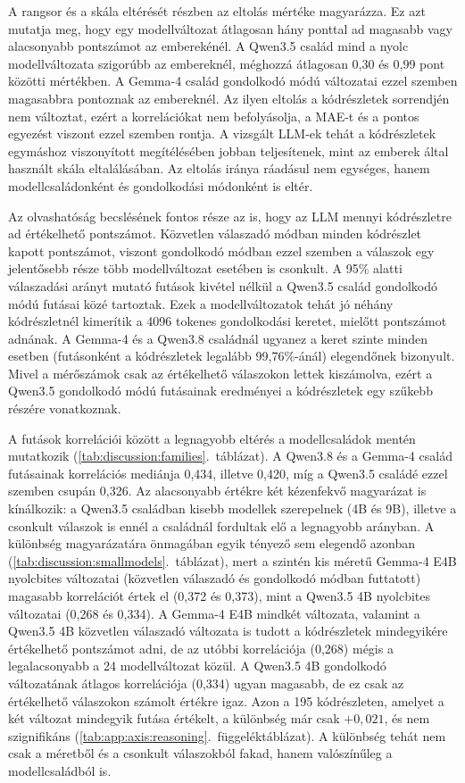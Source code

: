 \documentclass[
]{elteikthesis}[2024/04/26]
\begin{document}
A rangsor és a skála eltérését részben az eltolás mértéke magyarázza.
Ez azt mutatja meg, hogy egy modellváltozat átlagosan hány ponttal ad magasabb vagy alacsonyabb pontszámot az emberekénél.
A Qwen3.5 család mind a nyolc modellváltozata szigorúbb az embereknél, méghozzá átlagosan 0,30 és 0,99 pont közötti mértékben.
A Gemma-4 család gondolkodó módú változatai ezzel szemben magasabbra pontoznak az embereknél.
Az ilyen eltolás a kódrészletek sorrendjén nem változtat, ezért a korrelációkat nem befolyásolja,
a MAE-t és a pontos egyezést viszont ezzel szemben rontja.
A vizsgált LLM-ek tehát a kódrészletek egymáshoz viszonyított megítélésében jobban teljesítenek,
mint az emberek által használt skála eltalálásában.
Az eltolás iránya ráadásul nem egységes, hanem modellcsaládonként és gondolkodási módonként is eltér.

Az olvashatóság becslésének fontos része az is, hogy az LLM mennyi kódrészletre ad értékelhető pontszámot.
Közvetlen válaszadó módban minden kódrészlet kapott pontszámot, viszont gondolkodó módban
ezzel szemben a válaszok egy jelentősebb része több modellváltozat esetében is csonkult.
A 95\% alatti válaszadási arányt mutató futások kivétel nélkül a Qwen3.5 család gondolkodó módú futásai közé tartoztak.
Ezek a modellváltozatok tehát jó néhány kódrészletnél kimerítik a 4096 tokenes gondolkodási keretet, mielőtt pontszámot adnának.
A Gemma-4 és a Qwen3.8 családnál ugyanez a keret szinte minden esetben (futásonként a kódrészletek legalább 99,76\%-ánál) elegendőnek bizonyult.
Mivel a mérőszámok csak az értékelhető válaszokon lettek kiszámolva,
ezért a Qwen3.5 gondolkodó módú futásainak eredményei a kódrészletek egy szűkebb részére vonatkoznak.

A futások korrelációi között a legnagyobb eltérés a modellcsaládok mentén mutatkozik
(\ref{tab:discussion:families}.~táblázat).
A Qwen3.8 és a Gemma-4 család futásainak korrelációs mediánja 0,434, illetve 0,420,
míg a Qwen3.5 családé ezzel szemben csupán 0,326.
Az alacsonyabb értékre két kézenfekvő magyarázat is kínálkozik:
a Qwen3.5 családban kisebb modellek szerepelnek (4B és 9B),
illetve a csonkult válaszok is ennél a családnál fordultak elő a legnagyobb arányban.
A különbség magyarázatára önmagában egyik tényező sem elegendő azonban (\ref{tab:discussion:smallmodels}.~táblázat),
mert a szintén kis méretű Gemma-4 E4B nyolcbites változatai (közvetlen válaszadó és gondolkodó módban futtatott)
magasabb korrelációt értek el (0,372 és 0,373), mint a Qwen3.5 4B nyolcbites változatai (0,268 és 0,334).
A Gemma-4 E4B mindkét változata, valamint a Qwen3.5 4B közvetlen válaszadó változata is
tudott a kódrészletek mindegyikére értékelhető pontszámot adni,
de az utóbbi korrelációja (0,268) mégis a legalacsonyabb a 24 modellváltozat közül.
A Qwen3.5 4B gondolkodó változatának átlagos korrelációja (0,334) ugyan magasabb,
de ez csak az értékelhető válaszokon számolt értékre igaz.
Azon a 195 kódrészleten, amelyet a két változat mindegyik futása értékelt, a különbség már csak $+0{,}021$,
és nem szignifikáns (\ref{tab:app:axis:reasoning}.~függeléktáblázat).
A különbség tehát nem csak a méretből és a csonkult válaszokból fakad, hanem valószínűleg a modellcsaládból is.
\end{document}

